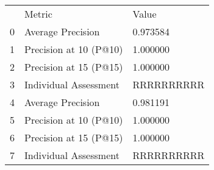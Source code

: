 \begin{tabular}{lll}
 & Metric & Value \\
0 & Average Precision & 0.973584 \\
1 & Precision at 10 (P@10) & 1.000000 \\
2 & Precision at 15 (P@15) & 1.000000 \\
3 & Individual Assessment & RRRRRRRRRR \\
4 & Average Precision & 0.981191 \\
5 & Precision at 10 (P@10) & 1.000000 \\
6 & Precision at 15 (P@15) & 1.000000 \\
7 & Individual Assessment & RRRRRRRRRR \\
\end{tabular}
